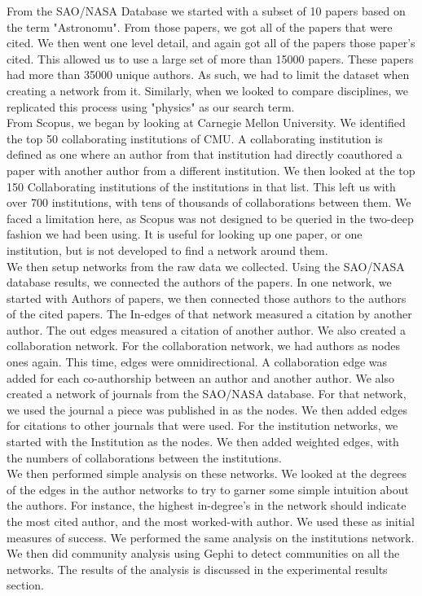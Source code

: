\documentclass[times, 10pt,twocolumn]{article}
\begin{document}
From the SAO/NASA Database we started with a subset of 10 papers based on the term "Astronomu". From those papers, we got all of the papers that were cited. We then went one level detail, and again got all of the papers those paper's cited. This allowed us to  use a large set  of more than 15000 papers. These papers had more than 35000 unique authors. As such, we had to limit the dataset when creating a network from it. Similarly, when we looked to compare disciplines, we replicated this process using "physics" as our search term. \\


From Scopus, we began by looking at Carnegie Mellon University. We identified the top 50 collaborating institutions of CMU. A collaborating institution is defined as one where an author from that institution had directly coauthored a paper with another author from a different institution. We then looked at the top 150 Collaborating institutions of the institutions in that list. This left us with over 700 institutions, with tens of thousands of collaborations between them.  We faced a limitation here, as Scopus was not designed to be queried in the two-deep fashion we had been using. It is useful for looking up one paper, or one institution, but is not developed to find a network around them.\\

We then setup networks from the raw data we collected. Using the SAO/NASA database results, we connected the authors of the papers. In one network, we started with Authors of papers, we then connected those authors to the authors of the cited papers. The In-edges of that network measured a citation by another author. The out edges measured a citation of another author. We also created a collaboration network. For the collaboration network, we had authors as nodes ones again. This time, edges were omnidirectional. A collaboration edge was added for each co-authorship between an author and another author. We also created a network of journals from the SAO/NASA database. For that network, we used the journal a piece was published in as the nodes. We then added edges for citations to other journals that were used. For the institution networks, we started with the Institution as the nodes. We then added weighted edges, with the numbers of collaborations between the institutions.  \\

We then performed simple analysis on these networks. We looked at the degrees of the edges in the author networks to try to garner some simple intuition about the authors. For instance, the highest in-degree's in the network should indicate the most cited author, and the most worked-with author. We used these as initial measures of success. We performed the same analysis on the institutions network. We then did community analysis using Gephi to detect communities on all the networks. The results of the analysis is discussed in the experimental results section. \\
\end{document}
